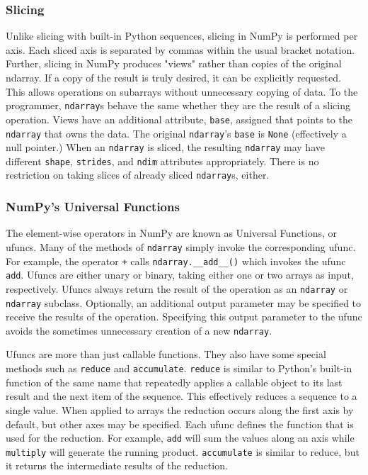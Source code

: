 \documentclass[preprint]{sigplanconf}
\begin{document}
\subsubsection{Slicing}

Unlike slicing with built-in Python sequences, slicing in NumPy is performed
per axis. Each sliced axis is separated by commas within the usual bracket
notation. Further, slicing in NumPy produces "views" rather than copies of the
original ndarray. If a copy of the result is truly desired, it can be
explicitly requested. This allows operations on subarrays without unnecessary
copying of data. To the programmer, \texttt{ndarray}s behave the same whether
they are the result of a slicing operation. Views have an additional
attribute, \texttt{base}, assigned that points to the \texttt{ndarray} that
owns the data. The original \texttt{ndarray}’s \texttt{base} is \texttt{None}
(effectively a null pointer.) When an \texttt{ndarray} is sliced, the
resulting \texttt{ndarray} may have different \texttt{shape},
\texttt{strides}, and \texttt{ndim} attributes appropriately. There is no
restriction on taking slices of already sliced \texttt{ndarray}s, either.

\subsubsection{NumPy's Universal Functions}

The element-wise operators in NumPy are known as Universal Functions, or
ufuncs. Many of the methods of \verb=ndarray= simply invoke the corresponding
ufunc. For example, the operator \verb=+= calls \verb=ndarray.__add__()= which
invokes the ufunc \verb=add=. Ufuncs are either unary or binary, taking either
one or two arrays as input, respectively. Ufuncs always return the result of
the operation as an \verb=ndarray= or \verb=ndarray= subclass. Optionally, an
additional output parameter may be specified to receive the results of the
operation.  Specifying this output parameter to the ufunc avoids the sometimes
unnecessary creation of a new \verb=ndarray=.

Ufuncs are more than just callable functions. They also have some special
methods such as \verb=reduce= and \verb=accumulate=. \verb=reduce= is similar
to Python’s built-in function of the same name that repeatedly applies a
callable object to its last result and the next item of the sequence. This
effectively reduces a sequence to a single value. When applied to arrays the
reduction occurs along the first axis by default, but other axes may be
specified. Each ufunc defines the function that is used for the reduction. For
example, \verb=add= will sum the values along an axis while \verb=multiply=
will generate the running product.  \verb=accumulate= is similar to reduce,
but it returns the intermediate results of the reduction.
\end{document}
